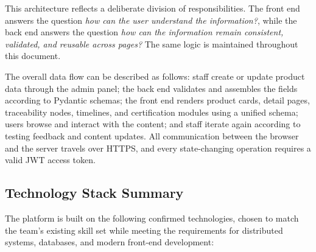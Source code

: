\documentclass[11pt]{article}
\begin{document}
This architecture reflects a deliberate division of responsibilities. The front end answers the question \emph{how can the user understand the information?}, while the back end answers the question \emph{how can the information remain consistent, validated, and reusable across pages?} The same logic is maintained throughout this document.

The overall data flow can be described as follows: staff create or update product data through the admin panel; the back end validates and assembles the fields according to Pydantic schemas; the front end renders product cards, detail pages, traceability nodes, timelines, and certification modules using a unified schema; users browse and interact with the content; and staff iterate again according to testing feedback and content updates. All communication between the browser and the server travels over HTTPS, and every state-changing operation requires a valid JWT access token.

\subsection{Technology Stack Summary}
The platform is built on the following confirmed technologies, chosen to match the team's existing skill set while meeting the requirements for distributed systems, databases, and modern front-end development:
\end{document}
